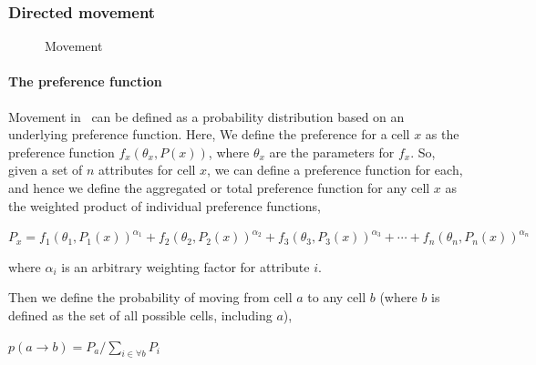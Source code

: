 \subsubsection{Directed movement}

\begin{figure}[htp]
 \caption{Movement}
 \label{fig:Movement}
\end{figure}


\paragraph{The preference function}

 Movement in \SPM\ can be defined as a probability distribution based on an underlying preference function. Here, We define the preference for a cell $x$ as the preference function $f_x(\theta_x,P(x))$, where $\theta_x$ are the parameters for $f_x$. So, given a set of $n$ attributes for cell $x$, we can define a preference function for each, and hence we define the aggregated or total preference function for any cell $x$ as the weighted product of individual preference functions,

$P_x=f_1(\theta_1,P_1(x))^{\alpha_1} + f_2(\theta_2,P_2(x))^{\alpha_2} + f_3(\theta_3,P_3(x))^{\alpha_3} + \cdots + f_n(\theta_n,P_n(x))^{\alpha_n}$

where $\alpha_i$ is an arbitrary weighting factor for attribute $i$.

Then we define the probability of moving from cell $a$ to any cell $b$ (where $b$ is defined as the set of all possible cells, including $a$),

$p(a\rightarrow b) = {P_a} / {\sum_{i \in \forall b}P_i}$

